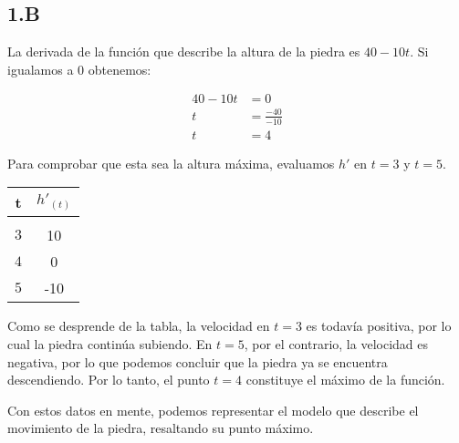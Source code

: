\subsection*{1.B}

La derivada de la función que describe la altura de la piedra es $40-10t$. Si igualamos a 0 obtenemos:

\begin{align*}
    40-10t &= 0 \\
    t &= \frac{-40}{-10}\\
    t &= 4
\end{align*}

Para comprobar que esta sea la altura máxima, evaluamos $h'$ en $t = 3$ y $t = 5$.

\begin{center}
\begin{tabular}{ c c }
	t	&	$h'_{(t)}$ \\
	\hline \\
	$3$	&	10\\	
	$4$	&	0\\
	$5$	&	-10
\end{tabular}
\end{center}

Como se desprende de la tabla, la velocidad en $t=3$ es todavía positiva, por lo cual la piedra continúa subiendo. En $t=5$, por el contrario, la velocidad es negativa, por lo que podemos concluir que la piedra ya se encuentra descendiendo. Por lo tanto, el punto $t=4$ constituye el máximo de la función.

Con estos datos en mente, podemos representar el modelo que describe el movimiento de la piedra, resaltando su punto máximo.

\begin{center}
\end{center}